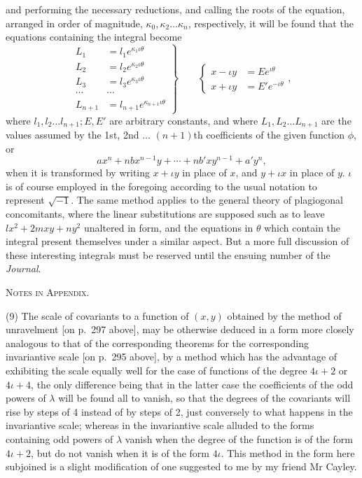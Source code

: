 \documentclass[11pt]{article}
\newcommand{\subpaperhead}[1]{\begin{center}{\large\scshape #1}\end{center}}
\newcommand{\sourcepage}[1]{\marginpar{\scriptsize p.~#1}}
\begin{document}
\sourcepage{360}
and performing the necessary reductions, and calling the roots of the equation, arranged in order of magnitude, $\kappa_0,\kappa_2\ldots\kappa_n$, respectively, it will be found that the equations containing the integral become
\[
\left.
\begin{array}{rl}
L_1&=l_1e^{\kappa_1\iota\theta}\\
L_2&=l_2e^{\kappa_2\iota\theta}\\
L_3&=l_3e^{\kappa_3\iota\theta}\\
\cdots&\cdots\\
L_{n+1}&=l_{n+1}e^{\kappa_{n+1}\iota\theta}
\end{array}
\right\}
\qquad
\left\{\begin{array}{rl}
x-\iota y&=Ee^{\iota\theta}\\
x+\iota y&=E'e^{-\iota\theta}
\end{array}\right.,
\]
where $l_1,l_2\ldots l_{n+1};E,E'$ are arbitrary constants, and where $L_1,L_2\ldots L_{n+1}$ are the values assumed by the 1st, 2nd $\ldots$ $(n+1)$th coefficients of the given function $\phi$, or
\[
ax^n+nbx^{n-1}y+\cdots+nb'xy^{n-1}+a'y^n,
\]
when it is transformed by writing $x+\iota y$ in place of $x$, and $y+\iota x$ in place of $y$. $\iota$ is of course employed in the foregoing according to the usual notation to represent $\sqrt{-1}$. The same method applies to the general theory of plagiogonal concomitants, where the linear substitutions are supposed such as to leave $lx^2+2mxy+ny^2$ unaltered in form, and the equations in $\theta$ which contain the integral present themselves under a similar aspect. But a more full discussion of these interesting integrals must be reserved until the ensuing number of the \emph{Journal}.

\subpaperhead{Notes in Appendix.}

(9) The scale of covariants to a function of $(x,y)$ obtained by the method of unravelment [on p.~297 above], may be otherwise deduced in a form more closely analogous to that of the corresponding theorems for the corresponding invariantive scale [on p.~295 above], by a method which has the advantage of exhibiting the scale equally well for the case of functions of the degree $4\iota+2$ or $4\iota+4$, the only difference being that in the latter case the coefficients of the odd powers of $\lambda$ will be found all to vanish, so that the degrees of the covariants will rise by steps of 4 instead of by steps of 2, just conversely to what happens in the invariantive scale; whereas in the invariantive scale alluded to the forms containing odd powers of $\lambda$ vanish when the degree of the function is of the form $4\iota+2$, but do not vanish when it is of the form $4\iota$. This method in the form here subjoined is a slight modification of one suggested to me by my friend Mr Cayley.
\end{document}
